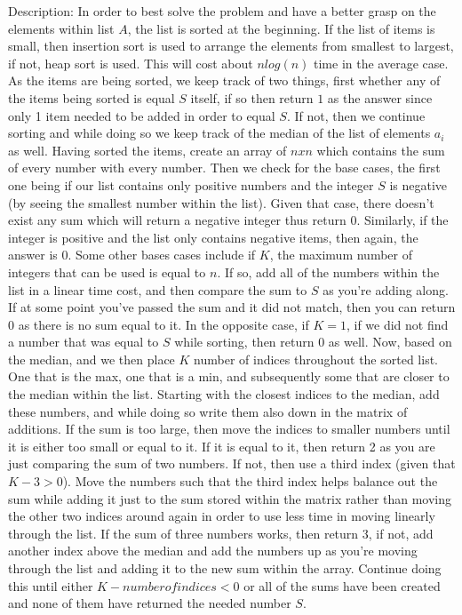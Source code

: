 \documentclass{article}
\begin{document}
Description: In order to best solve the problem and have a better grasp on the elements within list $A$, the list is sorted at the beginning. If the list of items is small, then insertion sort is used to arrange the elements from smallest to largest, if not, heap sort is used. This will cost about $nlog(n)$ time in the average case. As the items are being sorted, we keep track of two things, first whether any of the items being sorted is equal $S$ itself, if so then return $1$ as the answer since only 1 item needed to be added in order to equal $S$. If not, then we continue sorting and while doing so we keep track of the median of the list of elements $a_i$ as well. Having sorted the items, create an array of $nxn$ which contains the sum of every number with every number. Then we check for the base cases, the first one being if our list contains only positive numbers and the integer $S$ is negative (by seeing the smallest number within the list). Given that case, there doesn't exist any sum which will return a negative integer thus return $0$. Similarly, if the integer is positive and the list only contains negative items, then again, the answer is $0$. Some other bases cases include if $K$, the maximum number of integers that can be used is equal to $n$. If so, add all of the numbers within the list in a linear time cost, and then compare the sum to $S$ as you're adding along. If at some point you've passed the sum and it did not match, then  you can return $0$ as there is no sum equal to it. In the opposite case, if $K=1$, if we did not find a number that was equal to $S$ while sorting, then return $0$ as well. Now, based on the median, and we then place $K$ number of indices throughout the sorted list. One that is the max, one that is a min, and subsequently some that are closer to the median within the list. Starting with the closest indices to the median, add these numbers, and while doing so write them also down in the matrix of additions. If the sum is too large, then move the indices to smaller numbers until it is either too small or equal to it. If it is equal to it, then return 2 as you are just comparing the sum of two numbers. If not, then use a third index (given that $K-3>0$). Move the numbers such that the third index helps balance out the sum while adding it just to the sum stored within the matrix rather than moving the other two indices around again in order to use less time in moving linearly through the list. If the sum of three numbers works, then return $3$, if not, add another index above the median and add the numbers up as you're moving through the list and adding it to the new sum within the array. Continue doing this until either $K-number of indices <0$ or all of the sums have been created and none of them have returned the needed number $S$. \\
\end{document}
